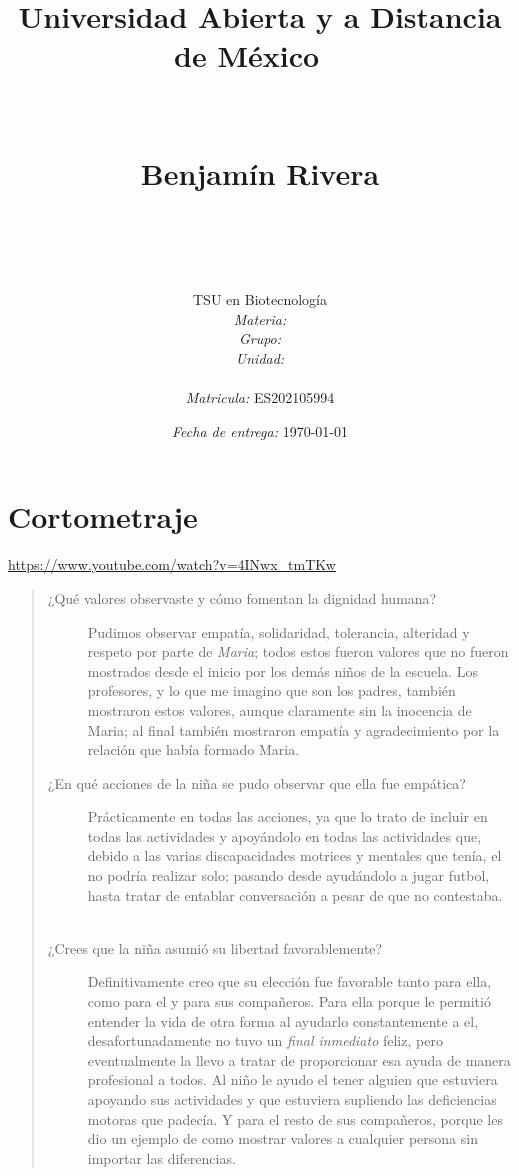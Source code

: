 \documentclass[12pt]{article}
\title{
	{\Huge Universidad Abierta y a Distancia de M\'exico}
	\ \\\ \\\ \\ {\Large Benjam\'in Rivera} \\
	\bf{\titulo}\\\ \\}
\author{
	TSU en Biotecnolog\'ia \\
	\textit{Materia:} \materia \\
	\textit{Grupo:} \grupo \\
	\textit{Unidad:} \unidad \\
	\\
	\textit{Matricula:} ES202105994 }
\date{\textit{Fecha de entrega:} \today}
\begin{document}
\maketitle\newpage


\section*{Cortometraje}
	\begin{center}
		\url{https://www.youtube.com/watch?v=4INwx_tmTKw}
	\end{center}

	\begin{quote}\begin{description}
		\item [¿Qué valores observaste y cómo fomentan la dignidad humana?] Pudimos observar empatía, solidaridad, tolerancia, alteridad y respeto por parte de \textit{Maria}; todos estos fueron valores que no fueron mostrados desde el inicio por los demás niños de la escuela. Los profesores, y lo que me imagino que son los padres, también mostraron estos valores, aunque claramente sin la inocencia de Maria; al final también mostraron empatía y agradecimiento por la relación que había formado Maria.
		\ \\
		\item [¿En qué acciones de la niña se pudo observar que ella fue empática?] Prácticamente en todas las acciones, ya que lo trato de incluir en todas las actividades y apoyándolo en todas las actividades que, debido a las varias discapacidades motrices y mentales que tenía, el no podría realizar solo; pasando desde ayudándolo a jugar futbol, hasta tratar de entablar conversación a pesar de que no contestaba.
		\ \\
		\item [¿Crees que la niña asumió su libertad favorablemente?] Definitivamente creo que su elección fue favorable tanto para ella, como para el y para sus compañeros. Para ella porque le permitió entender la vida de otra forma al ayudarlo constantemente a el, desafortunadamente no tuvo un \textit{final inmediato} feliz, pero eventualmente la llevo a tratar de proporcionar esa ayuda de manera profesional a todos. Al niño le ayudo el tener alguien que estuviera apoyando sus actividades y que estuviera supliendo las deficiencias motoras que padecía. Y para el resto de sus compañeros, porque les dio un ejemplo de como mostrar valores a cualquier persona sin importar las diferencias.
		
	\end{description}\end{quote}
\end{document}
